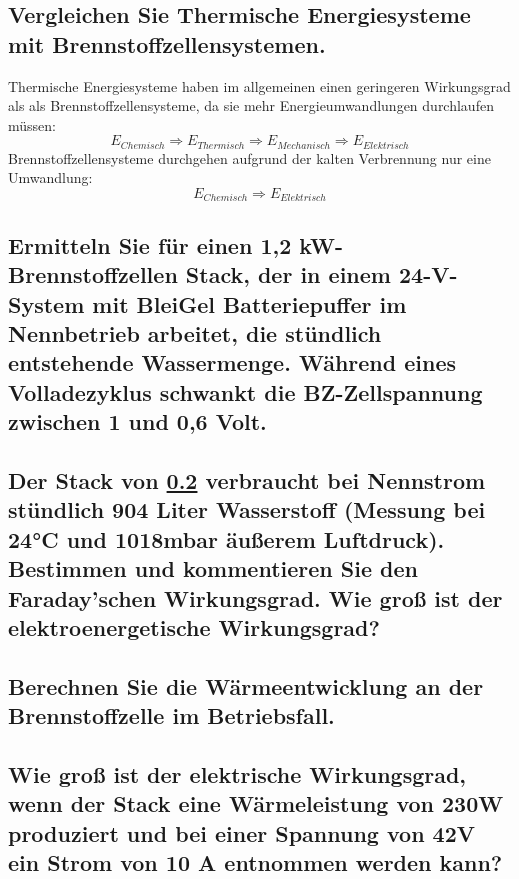 \subsection{Vergleichen Sie Thermische Energiesysteme mit Brennstoffzellensystemen.}

Thermische Energiesysteme haben im allgemeinen einen geringeren Wirkungsgrad als als Brennstoffzellensysteme, da sie  mehr Energieumwandlungen durchlaufen müssen:
$$E_{Chemisch} \Rightarrow E_{Thermisch} \Rightarrow E_{Mechanisch} \Rightarrow E_{Elektrisch}$$ 
Brennstoffzellensysteme durchgehen aufgrund der kalten Verbrennung nur eine Umwandlung:
$$E_{Chemisch} \Rightarrow E_{Elektrisch}$$

\subsection{Ermitteln Sie für einen 1,2 kW-Brennstoffzellen Stack, der in einem 24-V-System mit
BleiGel Batteriepuffer im Nennbetrieb arbeitet, die stündlich entstehende Wassermenge.
Während eines Volladezyklus schwankt die BZ-Zellspannung zwischen 1 und 0,6 Volt.}
\label{sec:VF_H2O_Menge}
\subsection{Der Stack von \ref{sec:VF_H2O_Menge} verbraucht bei Nennstrom stündlich 904 Liter Wasserstoff (Messung
bei 24°C und 1018mbar äußerem Luftdruck). Bestimmen und kommentieren Sie den
Faraday'schen Wirkungsgrad. Wie groß ist der elektroenergetische Wirkungsgrad?}
\subsection{Berechnen Sie die Wärmeentwicklung an der Brennstoffzelle im Betriebsfall.}
\subsection{Wie groß ist der elektrische Wirkungsgrad, wenn der Stack eine Wärmeleistung von
230W produziert und bei einer Spannung von 42V ein Strom von 10 A entnommen werden kann?}
